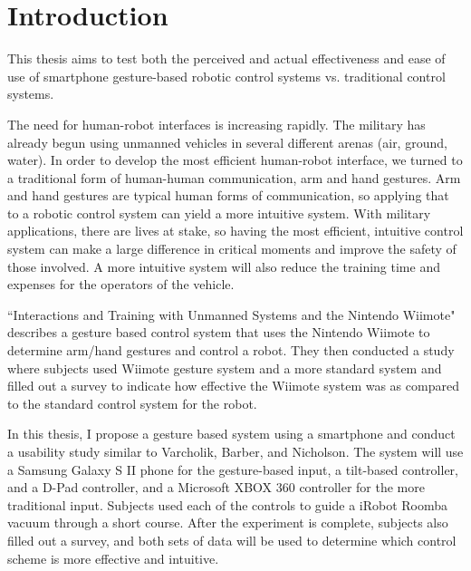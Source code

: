 \documentclass[12pt,a4paper]{report}
\begin{document}
\chapter{Introduction}
\pagestyle{headings}
\setcounter{page}{1}

This thesis aims to test both the perceived and actual effectiveness and ease of use of smartphone gesture-based robotic control systems vs. traditional control systems.

The need for human-robot interfaces is increasing rapidly. The military has already begun using unmanned vehicles in several different arenas (air, ground, water). In order to develop the most efficient human-robot interface, we turned to a traditional form of human-human communication, arm and hand gestures. Arm and hand gestures are typical human forms of communication, so applying that to a robotic control system can yield a more intuitive system. With military applications, there are lives at stake, so having the most efficient, intuitive control system can make a large difference in critical moments and improve the safety of those involved. A more intuitive system will also reduce the training time and expenses for the operators of the vehicle.

``Interactions and Training with Unmanned Systems and the Nintendo Wiimote" \cite{Varcholik_Barber_Nicholson_2008} describes a gesture based control system that uses the Nintendo Wiimote to determine arm/hand gestures and control a robot. They then conducted a study where subjects used Wiimote gesture system and a more standard system and filled out a survey to indicate how effective the Wiimote system was as compared to the standard control system for the robot.

In this thesis, I propose a gesture based system using a smartphone and conduct a usability study similar to Varcholik, Barber, and Nicholson. The system will use a Samsung Galaxy S II phone for the gesture-based input, a tilt-based controller, and a D-Pad controller, and a Microsoft XBOX 360 controller for the more traditional input. Subjects used each of the controls to guide a iRobot Roomba vacuum through a short course. After the experiment is complete, subjects also filled out a survey, and both sets of data will be used to determine which control scheme is more effective and intuitive.

\end{document}
